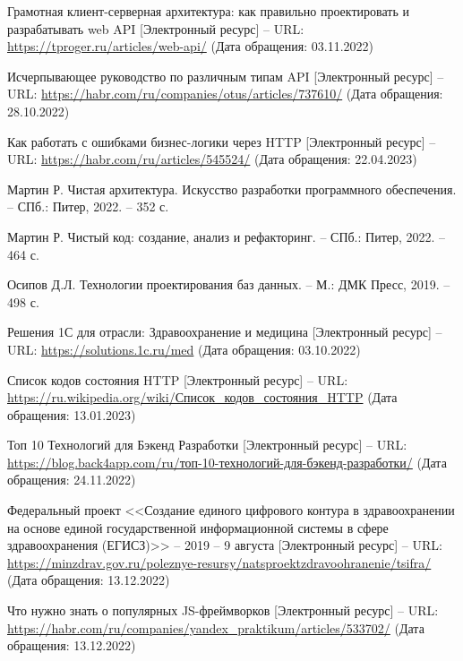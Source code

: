 \documentclass[a4paper,article]{article}
\begin{document}
\begin{sloppypar}
\begin{enumerate}[leftmargin=*, itemindent=\labelwidth]
         Грамотная клиент-серверная архитектура: как правильно проектировать и разрабатывать web API [Электронный ресурс] -- URL: \url{https://tproger.ru/articles/web-api/} (Дата обращения: 03.11.2022)
        
         Исчерпывающее руководство по различным типам API [Электронный ресурс] -- URL: \url{https://habr.com/ru/companies/otus/articles/737610/} (Дата обращения: 28.10.2022)
        
         Как работать с ошибками бизнес-логики через HTTP [Электронный ресурс] -- URL: \url{https://habr.com/ru/articles/545524/} (Дата обращения: 22.04.2023)
        
         Мартин Р. Чистая архитектура. Искусство разработки программного обеспечения. -- СПб.: Питер, 2022. -- 352 с.
        
         Мартин Р. Чистый код: создание, анализ и рефакторинг. -- СПб.: Питер, 2022. -- 464 с.
        
         Осипов Д.Л. Технологии проектирования баз данных. -- М.: ДМК Пресс, 2019. -- 498 с.
        
         Решения 1С для отрасли: Здравоохранение и медицина [Электронный ресурс] -- URL: \url{https://solutions.1c.ru/med} (Дата обращения: 03.10.2022)
        
         Список кодов состояния HTTP [Электронный ресурс] -- URL: \url{https://ru.wikipedia.org/wiki/Список_кодов_состояния_HTTP} (Дата обращения: 13.01.2023)
        
         Топ 10 Технологий для Бэкенд Разработки [Электронный ресурс] -- URL: \url{https://blog.back4app.com/ru/топ-10-технологий-для-бэкенд-разработки/} (Дата обращения: 24.11.2022)
        
         Федеральный проект <<Создание единого цифрового контура в здравоохранении на основе единой государственной информационной системы в сфере здравоохранения (ЕГИСЗ)>> -- 2019 -- 9 августа [Электронный ресурс] -- URL: \url{https://minzdrav.gov.ru/poleznye-resursy/natsproektzdravoohranenie/tsifra/} (Дата обращения: 13.12.2022)
        
         Что нужно знать о популярных JS-фреймворков [Электронный ресурс] -- URL: \url{https://habr.com/ru/companies/yandex_praktikum/articles/533702/} (Дата обращения: 13.12.2022)
    \end{enumerate}
    

\end{sloppypar}
\end{document}
